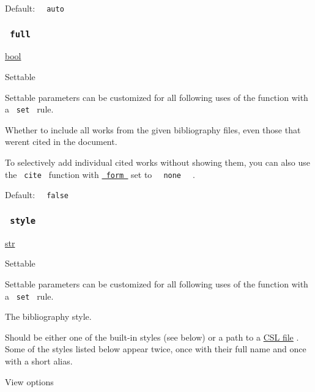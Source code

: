 Default: \texttt{\ }{\texttt{\ auto\ }}\texttt{\ }

\subsubsection{\texorpdfstring{\texttt{\ full\ }}{ full }}\label{parameters-full}

\href{/docs/reference/foundations/bool/}{bool}

{{ Settable }}

\label{parameters-full-settable-tooltip}
Settable parameters can be customized for all following uses of the
function with a \texttt{\ set\ } rule.

Whether to include all works from the given bibliography files, even
those that weren\textquotesingle t cited in the document.

To selectively add individual cited works without showing them, you can
also use the \texttt{\ cite\ } function with
\href{/docs/reference/model/cite/\#parameters-form}{\texttt{\ form\ }}
set to \texttt{\ }{\texttt{\ none\ }}\texttt{\ } .

Default: \texttt{\ }{\texttt{\ false\ }}\texttt{\ }

\subsubsection{\texorpdfstring{\texttt{\ style\ }}{ style }}\label{parameters-style}

\href{/docs/reference/foundations/str/}{str}

{{ Settable }}

\label{parameters-style-settable-tooltip}
Settable parameters can be customized for all following uses of the
function with a \texttt{\ set\ } rule.

The bibliography style.

Should be either one of the built-in styles (see below) or a path to a
\href{https://citationstyles.org/}{CSL file} . Some of the styles listed
below appear twice, once with their full name and once with a short
alias.


View options

